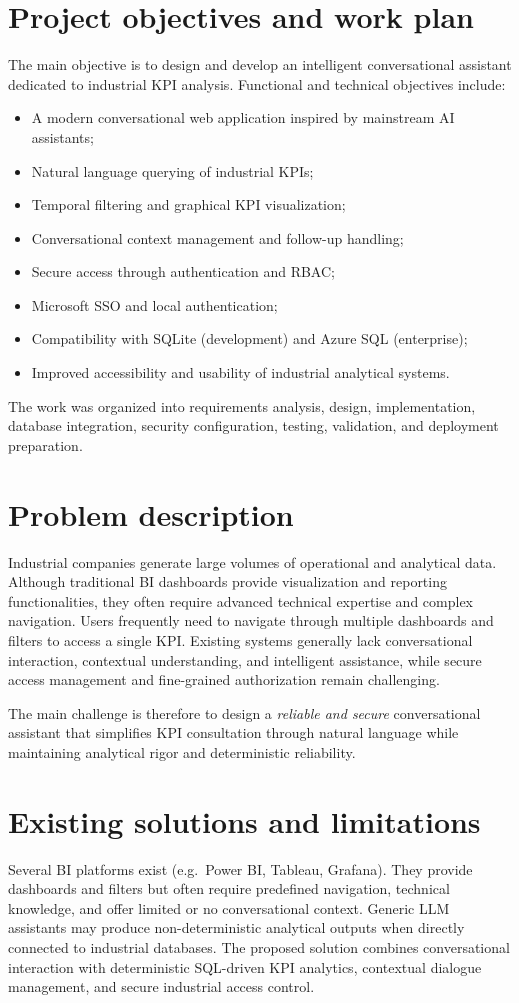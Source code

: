 \documentclass[12pt,a4paper,openany]{report}
\begin{document}
\section{Project objectives and work plan}
The main objective is to design and develop an intelligent conversational assistant dedicated to industrial KPI analysis. Functional and technical objectives include:
\begin{itemize}[leftmargin=*]
  \item A modern conversational web application inspired by mainstream AI assistants;
  \item Natural language querying of industrial KPIs;
  \item Temporal filtering and graphical KPI visualization;
  \item Conversational context management and follow-up handling;
  \item Secure access through authentication and RBAC;
  \item Microsoft SSO and local authentication;
  \item Compatibility with SQLite (development) and Azure SQL (enterprise);
  \item Improved accessibility and usability of industrial analytical systems.
\end{itemize}
The work was organized into requirements analysis, design, implementation, database integration, security configuration, testing, validation, and deployment preparation.

\section{Problem description}
Industrial companies generate large volumes of operational and analytical data. Although traditional BI dashboards provide visualization and reporting functionalities, they often require advanced technical expertise and complex navigation. Users frequently need to navigate through multiple dashboards and filters to access a single KPI. Existing systems generally lack conversational interaction, contextual understanding, and intelligent assistance, while secure access management and fine-grained authorization remain challenging.

The main challenge is therefore to design a \emph{reliable and secure} conversational assistant that simplifies KPI consultation through natural language while maintaining analytical rigor and deterministic reliability.

\section{Existing solutions and limitations}
Several BI platforms exist (e.g.\ Power BI, Tableau, Grafana). They provide dashboards and filters but often require predefined navigation, technical knowledge, and offer limited or no conversational context. Generic LLM assistants may produce non-deterministic analytical outputs when directly connected to industrial databases. The proposed solution combines conversational interaction with deterministic SQL-driven KPI analytics, contextual dialogue management, and secure industrial access control.
\end{document}
